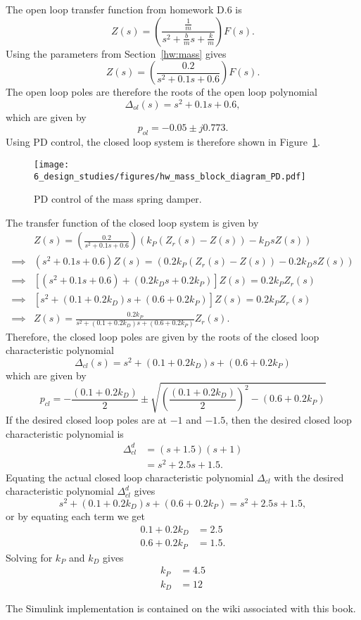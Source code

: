 
The open loop transfer function from homework D.6 is
\[
Z(s) = \left(\frac{\frac{1}{m}}{s^2+\frac{b}{m}s+\frac{k}{m}}\right)F(s).  
\]
Using the parameters from Section~\ref{hw:mass} gives
\[
Z(s) = \left(\frac{0.2}{s^2+0.1s+0.6}\right)F(s).  
\]
The open loop poles are therefore the roots of the open loop polynomial
\[
\Delta_{ol}(s) = s^2+0.1s+0.6,
\]
which are given by
\[
p_{ol} = -0.05\pm j 0.773.
\]
Using PD control, the closed loop system is therefore shown in Figure~\ref{fig:hw_mass_block_diagram_PD}.
\begin{figure}[H]
   \centering
   \texttt{[image: 6\_design\_studies/figures/hw\_mass\_block\_diagram\_PD.pdf]}
   \caption{PD control of the mass spring damper.}
   \label{fig:hw_mass_block_diagram_PD}
\end{figure}
The transfer function of the closed loop system is given by
\begin{align*}
& Z(s) = \left(\frac{0.2}{s^2+0.1s+0.6}\right)\left(k_P (Z_r(s)-Z(s)) - k_D s Z(s) \right)  \\
\implies & (s^2+0.1s+0.6)Z(s) = \left(0.2 k_P (Z_r(s)-Z(s)) - 0.2 k_D s Z(s) \right) \\
\implies & \left[(s^2+0.1s+0.6)+\left(0.2k_D s +0.2k_P\right)\right]Z(s) = 0.2k_P Z_r(s)  \\
\implies & \left[s^2 + (0.1 + 0.2k_D)s + (0.6+0.2k_P)\right]Z(s) = 0.2k_P Z_r(s)  \\
\implies & Z(s) = \frac{0.2k_P}{s^2 + (0.1 + 0.2k_D)s + (0.6+0.2k_P)}Z_r(s). 
\end{align*}
Therefore, the closed loop poles are given by the roots of the closed loop characteristic polynomial
\[
\Delta_{cl}(s) = s^2 + (0.1 + 0.2k_D)s + (0.6+0.2k_P)
\]
which are given by
\[
p_{cl} = -\frac{(0.1 + 0.2k_D)}{2} \pm \sqrt{ \left(\frac{(0.1 + 0.2k_D)}{2}\right)^2 - \left(0.6+0.2k_P\right)}
\]
If the desired closed loop poles are at $-1$ and $-1.5$, then the desired closed loop characteristic polynomial is
\begin{align*}
\Delta_{cl}^d &= (s+1.5)(s+1) \\
 &= s^2 + 2.5s + 1.5.
\end{align*}
Equating the actual closed loop characteristic polynomial $\Delta_{cl}$ with the desired characteristic polynomial $\Delta_{cl}^d$ gives
\[
s^2 + (0.1 + 0.2k_D)s + (0.6+0.2k_P) = s^2 + 2.5s + 1.5,
\]
or by equating each term we get 
\begin{align*}
0.1 + 0.2k_D &=2.5 \\
0.6 + 0.2k_P &= 1.5.
\end{align*}
Solving for $k_P$ and $k_D$ gives
\begin{align*}
k_P &= 4.5 \\
k_D &= 12
\end{align*}

The Simulink implementation is contained on the wiki associated with this book.
